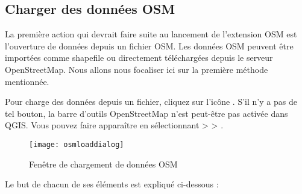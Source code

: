 \subsection{Charger des données OSM}

La première action qui devrait faire suite au lancement de l'extension OSM est l'ouverture de données depuis un fichier OSM. Les données OSM peuvent être importées comme shapefile ou directement téléchargées depuis le serveur OpenStreetMap. Nous allons nous focaliser ici sur la première méthode mentionnée.

Pour charge des données depuis un fichier, cliquez sur l'icône . S'il n'y a pas de tel bouton, la barre d'outils OpenStreetMap n'est peut-être pas activée dans QGIS. Vous pouvez faire apparaître en sélectionnant  >  > .

\begin{figure}[ht]
   \centering
   \texttt{[image: osmloaddialog]}
   \caption{Fenêtre de chargement de données OSM \nixcaption}\label{fig:osmload}
\end{figure}

Le but de chacun de ses éléments est expliqué ci-dessous :

